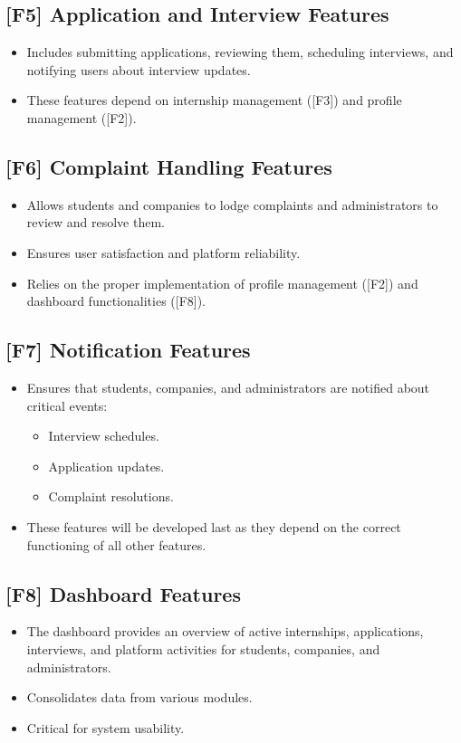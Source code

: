 \subsection{[F5] Application and Interview Features}
\begin{itemize}
    \item Includes submitting applications, reviewing them, scheduling interviews, and notifying users about interview updates.
    \item These features depend on internship management ([F3]) and profile management ([F2]).
\end{itemize}

\subsection{[F6] Complaint Handling Features}
\begin{itemize}
    \item Allows students and companies to lodge complaints and administrators to review and resolve them.
    \item Ensures user satisfaction and platform reliability.
    \item Relies on the proper implementation of profile management ([F2]) and dashboard functionalities ([F8]).
\end{itemize}

\subsection{[F7] Notification Features}
\begin{itemize}
    \item Ensures that students, companies, and administrators are notified about critical events:
    \begin{itemize}
        \item Interview schedules.
        \item Application updates.
        \item Complaint resolutions.
    \end{itemize}
    \item These features will be developed last as they depend on the correct functioning of all other features.
\end{itemize}

\subsection{[F8] Dashboard Features}
\begin{itemize}
    \item The dashboard provides an overview of active internships, applications, interviews, and platform activities for students, companies, and administrators.
    \item Consolidates data from various modules.
    \item Critical for system usability.
\end{itemize}

